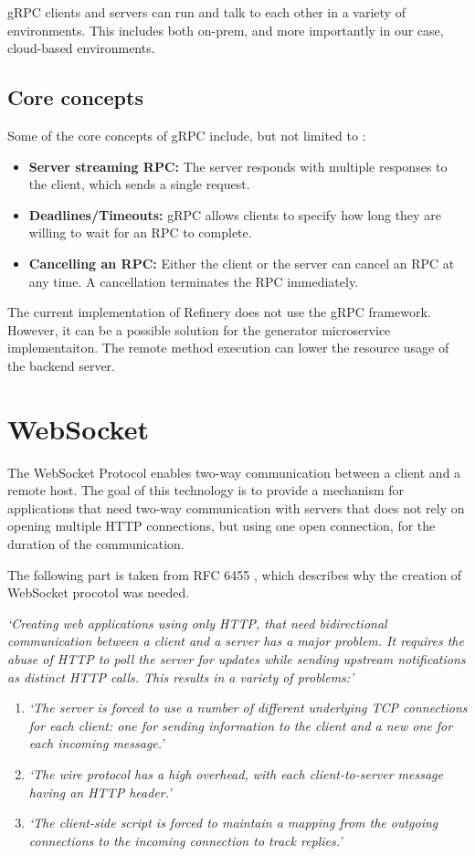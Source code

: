 	gRPC clients and servers can run and talk to each other in a variety of environments. This includes both on-prem, and more importantly in our case,
	cloud-based environments.

	\subsection{Core concepts}
	Some of the core concepts of gRPC include, but not limited to \cite{grpcspec2}:
	\begin{itemize}
		\item \textbf{Server streaming RPC:} The server responds with multiple responses to the client, which sends a single request. 
		\item \textbf{Deadlines/Timeouts:} gRPC allows clients to specify how long they are willing to wait for an RPC to complete. 
		\item \textbf{Cancelling an RPC:} Either the client or the server can cancel an RPC at any time. 
		A cancellation terminates the RPC immediately.
	\end{itemize}

	The current implementation of Refinery does not use the gRPC framework. However, it can be a possible solution for the generator microservice implementaiton. 
	The remote method execution can lower the resource usage of the backend server.

\section{WebSocket} \label{backgrwebsocket}
	The WebSocket Protocol \cite{websocket} enables two-way communication between a client
	and a remote host.
	The goal of
	this technology is to provide a mechanism for applications that need two-way communication with servers that does
	not rely on opening multiple HTTP connections, but using one open connection, for the duration of the communication.

	The following part is taken from RFC 6455 \cite{websocket}, which describes why the creation of WebSocket procotol was needed.

	\textit{
		`Creating web applications using only HTTP, that need bidirectional
		communication between a client and a server has a major problem. 
		It requires the abuse of HTTP to poll the
		server for updates while sending upstream notifications as distinct
		HTTP calls.
		This results in a variety of problems:'
	}
	\begin{enumerate}
		\item \textit{`The server is forced to use a number of different underlying TCP
		connections for each client: one for sending information to the
		client and a new one for each incoming message.'}
		\item \textit{`The wire protocol has a high overhead, with each client-to-server
		message having an HTTP header.'}
		\item \textit{`The client-side script is forced to maintain a mapping from the
		outgoing connections to the incoming connection to track replies.'}
	\end{enumerate}

